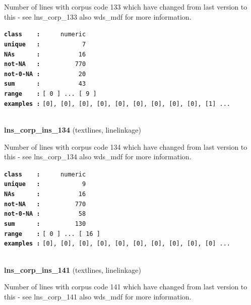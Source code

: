 \documentclass[]{article}
\begin{document}
Number of lines with corpus code 133 which have changed from last
version to this - see lns\_corp\_133 also wds\_mdf for more information.

\textbf{\texttt{class\ \ \ \ :}} \texttt{~~~~~numeric}\\
\textbf{\texttt{unique\ \ \ :}} \texttt{~~~~~~~~~~~7}\\
\textbf{\texttt{NAs\ \ \ \ \ \ :}} \texttt{~~~~~~~~~~16}\\
\textbf{\texttt{not-NA\ \ \ :}} \texttt{~~~~~~~~~770}\\
\textbf{\texttt{not-0-NA\ :}} \texttt{~~~~~~~~~~20}\\
\textbf{\texttt{sum\ \ \ \ \ \ :}} \texttt{~~~~~~~~~~43}\\
\textbf{\texttt{range\ \ \ \ :}}
\texttt{{[}\ 0\ {]}\ ...\ {[}\ 9\ {]}}\\
\textbf{\texttt{examples\ :}}
\texttt{{[}0{]},\ {[}0{]},\ {[}0{]},\ {[}0{]},\ {[}0{]},\ {[}0{]},\ {[}0{]},\ {[}0{]},\ {[}0{]},\ {[}1{]}\ ...}\\

~

\textbf{lns\_corp\_ins\_134} (textlines, linelinkage)

Number of lines with corpus code 134 which have changed from last
version to this - see lns\_corp\_134 also wds\_mdf for more information.

\textbf{\texttt{class\ \ \ \ :}} \texttt{~~~~~numeric}\\
\textbf{\texttt{unique\ \ \ :}} \texttt{~~~~~~~~~~~9}\\
\textbf{\texttt{NAs\ \ \ \ \ \ :}} \texttt{~~~~~~~~~~16}\\
\textbf{\texttt{not-NA\ \ \ :}} \texttt{~~~~~~~~~770}\\
\textbf{\texttt{not-0-NA\ :}} \texttt{~~~~~~~~~~58}\\
\textbf{\texttt{sum\ \ \ \ \ \ :}} \texttt{~~~~~~~~~130}\\
\textbf{\texttt{range\ \ \ \ :}}
\texttt{{[}\ 0\ {]}\ ...\ {[}\ 16\ {]}}\\
\textbf{\texttt{examples\ :}}
\texttt{{[}0{]},\ {[}0{]},\ {[}0{]},\ {[}0{]},\ {[}0{]},\ {[}0{]},\ {[}0{]},\ {[}0{]},\ {[}0{]},\ {[}0{]}\ ...}\\

~

\textbf{lns\_corp\_ins\_141} (textlines, linelinkage)

Number of lines with corpus code 141 which have changed from last
version to this - see lns\_corp\_141 also wds\_mdf for more information.
\end{document}
